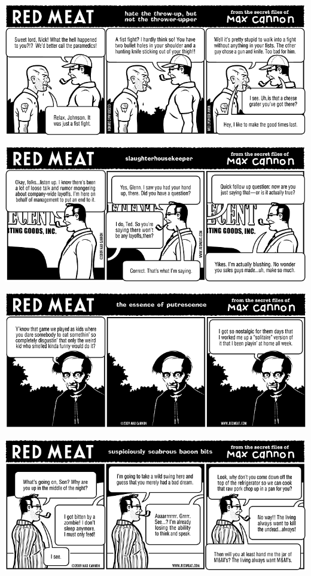 \documentclass[a4paper,twoside,11pt]{article}
\begin{document}
\includegraphics[width=\textwidth]{redmeat_2009-02-10.png}



\includegraphics[width=\textwidth]{redmeat_2009-02-17.png}



\includegraphics[width=\textwidth]{redmeat_2009-02-24.png}



\includegraphics[width=\textwidth]{redmeat_2009-03-03.png}
\end{document}

